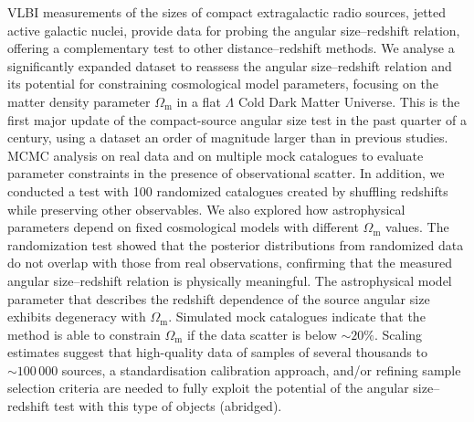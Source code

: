 \documentclass[11pt]{article}
\begin{document}
VLBI measurements of the sizes of compact extragalactic radio sources, jetted active galactic nuclei, provide data for probing the angular size--redshift relation, offering a complementary test to other distance--redshift methods. We analyse a significantly expanded dataset to reassess the angular size--redshift relation and its potential for constraining cosmological model parameters, focusing on the matter density parameter $Ω_{\mathrm{m}}$ in a flat $Λ$ Cold Dark Matter Universe. This is the first major update of the compact-source angular size test in the past quarter of a century, using a dataset an order of magnitude larger than in previous studies. MCMC analysis on real data and on multiple mock catalogues to evaluate parameter constraints in the presence of observational scatter. In addition, we conducted a test with 100 randomized catalogues created by shuffling redshifts while preserving other observables. We also explored how astrophysical parameters depend on fixed cosmological models with different $Ω_{\mathrm{m}}$ values. The randomization test showed that the posterior distributions from randomized data do not overlap with those from real observations, confirming that the measured angular size--redshift relation is physically meaningful. The astrophysical model parameter that describes the redshift dependence of the source angular size exhibits degeneracy with $Ω_{\mathrm{m}}$. Simulated mock catalogues indicate that the method is able to constrain $Ω_{\mathrm{m}}$ if the data scatter is below $\sim20\%$. Scaling estimates suggest that high-quality data of samples of several thousands to $\sim 100\,000$ sources, a standardisation calibration approach, and/or refining sample selection criteria are needed to fully exploit the potential of the angular size--redshift test with this type of objects (abridged).
\newpage
\end{document}

